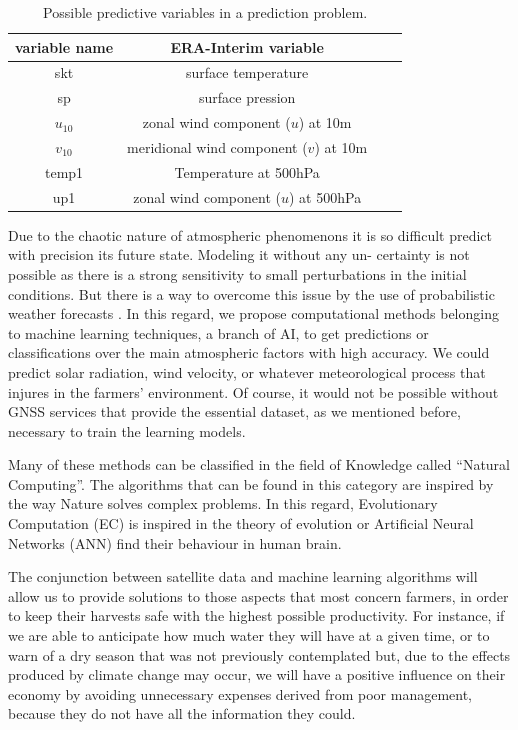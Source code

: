 \vspace{12pt}
\begin{table}[H]
\begin{center}
\caption{\label{Variables_ERA} Possible predictive variables in a prediction problem.}
\begin{tabular}{cccc}
\hline
variable name & ERA-Interim variable\\
\hline
\hline
skt & surface temperature\\
sp & surface pression\\
$u_{10}$& zonal wind component ($u$) at 10m\\
$v_{10}$& meridional wind component ($v$) at 10m\\
temp1& Temperature at 500hPa\\
up1& zonal wind component ($u$) at 500hPa\\
\hline
\end{tabular}
\end{center}
\end{table}
\vspace{12pt}

Due to the chaotic nature of atmospheric phenomenons it is so difficult predict with precision its future state. Modeling it without any un- certainty is not possible as there is a strong sensitivity to small perturbations in the initial conditions. But there is a way to overcome this issue by the use of probabilistic weather forecasts \cite{martinez2015forecasting}. In this regard, we propose computational methods belonging to machine learning techniques, a branch of AI, to get predictions or classifications over the main atmospheric factors with high accuracy. We could predict solar radiation, wind velocity, or whatever meteorological process that injures in the farmers' environment. Of course, it would not be possible without GNSS services that provide the essential dataset, as we mentioned before, necessary to train the learning models.

Many of these methods can be classified in the field of Knowledge called “Natural Computing”. The algorithms that can be found in this category are inspired by the way Nature solves complex problems. In this regard, Evolutionary Computation (EC) is inspired in the theory of evolution or Artificial Neural Networks (ANN) find their behaviour in human brain.

The conjunction between satellite data and machine learning algorithms will allow us to provide solutions to those aspects that most concern farmers, in order to keep their harvests safe with the highest possible productivity. For instance, if we are able to anticipate how much water they will have at a given time, or to warn of a dry season that was not previously contemplated but, due to the effects produced by climate change may occur, we will have a positive influence on their economy by avoiding unnecessary expenses derived from poor management, because they do not have all the information they could.

